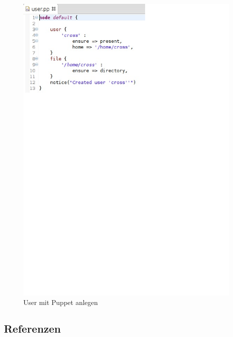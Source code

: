 \documentclass{article}
\begin{document}
\begin{figure}[h]
\includegraphics{user.pp.eps}
\caption{User mit Puppet anlegen}
\label{user.pp}
\end{figure}

\author{Michael Haslgrübler}

\author{Anders Malmborg}

\subsection{Referenzen}
\end{document}

